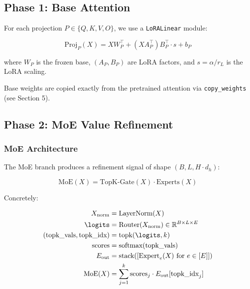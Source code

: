 \subsection{Phase 1: Base Attention}

For each projection $P \in \{Q, K, V, O\}$, we use a \texttt{LoRALinear} module:

\begin{equation}
\text{Proj}_P(X) = X W_P^\top + (X A_P^\top) B_P^\top \cdot s + b_P
\end{equation}

where $W_P$ is the frozen base, $(A_P, B_P)$ are LoRA factors, and 
$s = \alpha/r_L$ is the LoRA scaling.

Base weights are copied exactly from the pretrained attention via 
\texttt{copy\_weights} (see Section 5).

\subsection{Phase 2: MoE Value Refinement}

\subsubsection{MoE Architecture}

The MoE branch produces a refinement signal of shape 
$(B, L, H \cdot d_h)$:

\begin{equation}
\text{MoE}(X) = \text{TopK-Gate}(X) \cdot \text{Experts}(X)
\end{equation}

Concretely:

\begin{equation}
\begin{aligned}
X_\text{norm} &= \text{LayerNorm}(X) \\
\logits &= \text{Router}(X_\text{norm}) \in \mathbb{R}^{B \times L \times E} \\
(\text{topk\_vals}, \text{topk\_idx}) &= \text{topk}(\logits, k) \\
\text{scores} &= \text{softmax}(\text{topk\_vals}) \\
E_\text{out} &= \text{stack}([\text{Expert}_e(X) \text{ for } e \in [E]]) \\
\text{MoE}(X) &= \sum_{j=1}^{k} \text{scores}_j \cdot E_\text{out}[\text{topk\_idx}_j]
\end{aligned}
\end{equation}

